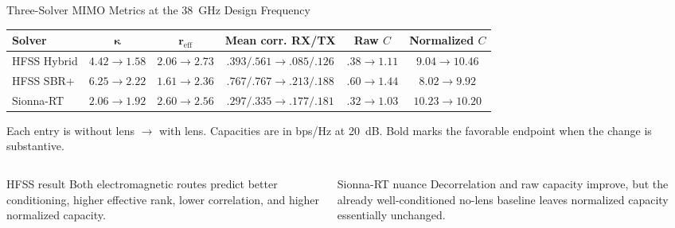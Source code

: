 \begin{frame}[t]{Three-Solver MIMO Metrics at the 38~GHz Design Frequency}
\scriptsize
\setlength{\tabcolsep}{2.5pt}
\renewcommand{\arraystretch}{1.32}
\centering
\begin{tabular}{@{}lccccc@{}}
  \toprule
  \textbf{Solver} & $\boldsymbol{\kappa}$ & $\boldsymbol{r_{\mathrm{eff}}}$ &
  \textbf{Mean corr. RX/TX} & \textbf{Raw $C$} & \textbf{Normalized $C$}\\
  \midrule
  HFSS Hybrid & $4.42\!\rightarrow\!\mathbf{1.58}$ & $2.06\!\rightarrow\!\mathbf{2.73}$ &
  $.393/.561\!\rightarrow\!\mathbf{.085/.126}$ & $.38\!\rightarrow\!\mathbf{1.11}$ & $9.04\!\rightarrow\!\mathbf{10.46}$\\
  HFSS SBR+ & $6.25\!\rightarrow\!\mathbf{2.22}$ & $1.61\!\rightarrow\!\mathbf{2.36}$ &
  $.767/.767\!\rightarrow\!\mathbf{.213/.188}$ & $.60\!\rightarrow\!\mathbf{1.44}$ & $8.02\!\rightarrow\!\mathbf{9.92}$\\
  Sionna-RT & $2.06\!\rightarrow\!1.92$ & $2.60\!\rightarrow\!2.56$ &
  $.297/.335\!\rightarrow\!\mathbf{.177/.181}$ & $.32\!\rightarrow\!\mathbf{1.03}$ & $10.23\!\rightarrow\!10.20$\\
  \bottomrule
\end{tabular}

\vspace{0.25cm}
{\tiny Each entry is without lens $\rightarrow$ with lens. Capacities are in
bps/Hz at 20~dB. Bold marks the favorable endpoint when the change is substantive.}

\vspace{0.35cm}
\begin{columns}[T,onlytextwidth]
  \begin{block}{HFSS result}
    Both electromagnetic routes predict better conditioning, higher effective
    rank, lower correlation, and higher normalized capacity.
  \end{block}
  \begin{block}{Sionna-RT nuance}
    Decorrelation and raw capacity improve, but the already well-conditioned
    no-lens baseline leaves normalized capacity essentially unchanged.
  \end{block}
\end{columns}


\end{frame}
